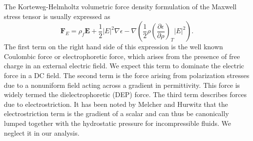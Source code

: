 \documentclass[12pt,a4paper,oneside]{book}
\begin{document}
The Korteweg-Helmholtz volumetric force density formulation of the Maxwell stress tensor is usually expressed as \cite{melcher_continuum_????}
\begin{equation}\label{force_density}
\mathbf{F}_E = \rho_f \mathbf{E} + \frac{1}{2} \left| E \right|^2 \nabla \epsilon - \nabla \left( \frac{1}{2} \rho \left( \frac{\partial \epsilon}{\partial \rho} \right)_T \left| E \right|^2 \right) .
\end{equation}
The first term on the right hand side of this expression is the well known Coulombic force or electrophoretic force, which arises from the presence of free charge in an external electric field. We expect this term to dominate the electric force in a DC field. The second term is the force arising from polarization stresses due to a nonuniform field acting across a gradient in permittivity. This force is widely termed the dielectrophoretic (DEP) force. The third term describes forces due to electrostriction. It has been noted by Melcher and Hurwitz \cite{hurwitz_electrohydrodynamic_1966} that the electrostriction term is the gradient of a scalar and can thus be canonically lumped together with the hydrostatic pressure for incompressible fluids. We neglect it in our analysis. 
\end{document}
